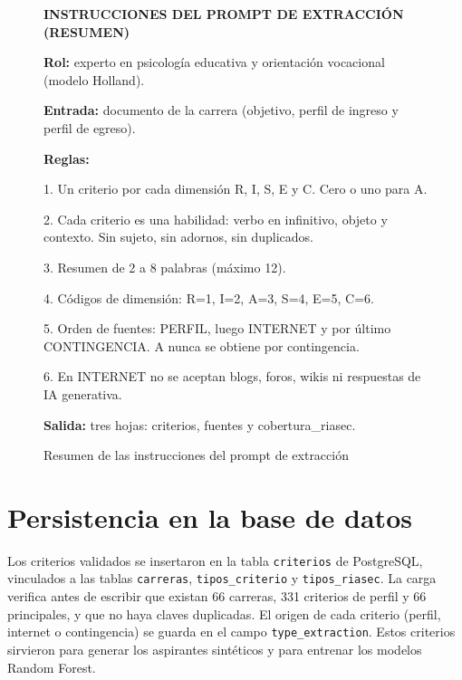 \begin{figure}[htbp]
\centering
\begin{minipage}{0.95\textwidth}
\ttfamily\small
\textbf{INSTRUCCIONES DEL PROMPT DE EXTRACCIÓN (RESUMEN)}\par\smallskip
\textbf{Rol:} experto en psicología educativa y orientación vocacional (modelo Holland).\par
\textbf{Entrada:} documento de la carrera (objetivo, perfil de ingreso y perfil de egreso).\par\smallskip
\textbf{Reglas:}\par
1. Un criterio por cada dimensión R, I, S, E y C. Cero o uno para A.\par
2. Cada criterio es una habilidad: verbo en infinitivo, objeto y contexto. Sin sujeto, sin adornos, sin duplicados.\par
3. Resumen de 2 a 8 palabras (máximo 12).\par
4. Códigos de dimensión: R=1, I=2, A=3, S=4, E=5, C=6.\par
5. Orden de fuentes: PERFIL, luego INTERNET y por último CONTINGENCIA. A nunca se obtiene por contingencia.\par
6. En INTERNET no se aceptan blogs, foros, wikis ni respuestas de IA generativa.\par\smallskip
\textbf{Salida:} tres hojas: criterios, fuentes y cobertura\_riasec.
\end{minipage}
\caption{Resumen de las instrucciones del prompt de extracción}
\label{fig:prompt-extraccion}
\end{figure}

\section{Persistencia en la base de datos}
Los criterios validados se insertaron en la tabla \texttt{criterios} de PostgreSQL, vinculados a las tablas \texttt{carreras}, \texttt{tipos\_criterio} y \texttt{tipos\_riasec}. La carga verifica antes de escribir que existan 66 carreras, 331 criterios de perfil y 66 principales, y que no haya claves duplicadas. El origen de cada criterio (perfil, internet o contingencia) se guarda en el campo \texttt{type\_extraction}. Estos criterios sirvieron para generar los aspirantes sintéticos y para entrenar los modelos Random Forest.

\endinput
